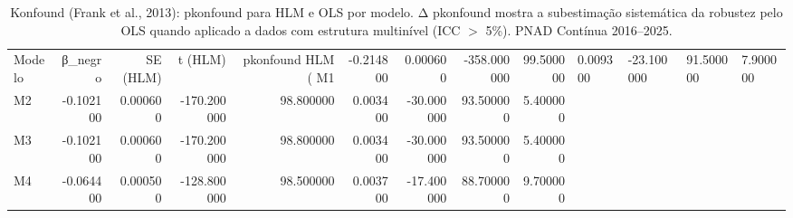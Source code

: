 \begin{table}
\caption{Konfound (Frank et al., 2013): pkonfound para HLM e OLS por modelo. Δ pkonfound mostra a subestimação sistemática da robustez pelo OLS quando aplicado a dados com estrutura multinível (ICC $>$ 5\%). PNAD Contínua 2016--2025.}
\label{tab:konfound_hlm_vs_ols}
\begin{tabular}{lrrrrrrrr}
\toprule
Modelo & β_negro & SE (HLM) & t (HLM) & pkonfound HLM (%
\midrule
M1 & -0.214800 & 0.000600 & -358.000000 & 99.500000 & 0.009300 & -23.100000 & 91.500000 & 7.900000 \\
M2 & -0.102100 & 0.000600 & -170.200000 & 98.800000 & 0.003400 & -30.000000 & 93.500000 & 5.400000 \\
M3 & -0.102100 & 0.000600 & -170.200000 & 98.800000 & 0.003400 & -30.000000 & 93.500000 & 5.400000 \\
M4 & -0.064400 & 0.000500 & -128.800000 & 98.500000 & 0.003700 & -17.400000 & 88.700000 & 9.700000 \\
\bottomrule
\end{tabular}
\end{table}
